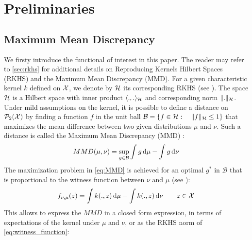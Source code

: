 
\section{Preliminaries}\label{sec:preliminaries}


\subsection{Maximum Mean Discrepancy}\label{subsec:MMD}
We firsty introduce the functional of interest in this paper. The reader may refer to \cref{sec:rkhs} for additional details on Reproducing Kernels Hilbert Spaces (RKHS) and the Maximum Mean Discrepancy (MMD). For a given characteristic kernel $k$ defined on ${{\mathcal X}}$, we denote by ${{\mathcal H}}$ its corresponding RKHS (see \cite{smola1998learning}). The space ${{\mathcal H}}$ is a Hilbert space with inner product $\langle .,. \rangle_{{{\mathcal H}}}$ and corresponding norm $\Vert . \Vert_{{{\mathcal H}}}$. %
Under mild assumptions on the kernel, it is possible to define a distance on $\mathcal{P}_2({{\mathcal X}})$ by finding a function $f$ in the unit ball $\mathcal{B} = \{ f\in {{\mathcal H}} : \quad \Vert f\Vert_{{{\mathcal H}}}\leq 1 \}$ that maximizes the mean difference between two given distributions $\mu$ and $\nu$. Such a distance is called the Maximum Mean Discrepancy  (MMD) \cite{Gretton:2012}:
\begin{align}\label{eq:MMD}
MMD(\mu,\nu) = \sup_{g\in \mathcal{B}} \int g\mathop{}\!\mathrm{d}\mu - \int g \mathop{}\!\mathrm{d}\nu
\end{align}
The maximization problem in \cref{eq:MMD} is achieved for an optimal $g^*$ in $\mathcal{B}$ that is proportional to the  witness function between $\nu$ and $\mu$ (see  \cite{gretton2012kernel}):
\begin{align}\label{eq:witness_function}
f_{\nu,\mu}(z) = \int k(.,z)\mathop{}\!\mathrm{d} \mu - \int k(.,z)\mathop{}\!\mathrm{d} \nu  \qquad z\in {{\mathcal X}}
\end{align}
This allows to express the $MMD$ in a closed form expression, in terms of expectations of the kernel under $\mu$ and $\nu$, or as the RKHS norm of \cref{eq:witness_function}:
